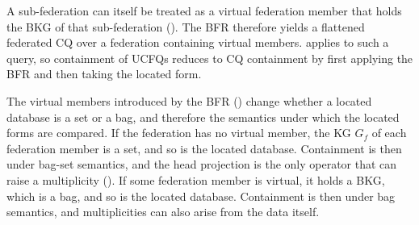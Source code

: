 \documentclass[../main]{subfiles}
\begin{document}
\begin{remark}\label{rem_ucfq_located}
  A sub-federation can itself be treated as a virtual federation member that holds the \ac{BKG} of that sub-federation ().
  The \ac{BFR} therefore yields a flattened federated \ac{CQ} over a federation containing virtual members.
   applies to such a query, so containment of \acp{UCFQ} reduces to \ac{CQ} containment by first applying the \ac{BFR} and then taking the located form.
\end{remark}

\begin{remark}\label{rem_located_db_bag}
  The virtual members introduced by the \ac{BFR} () change whether a located database is a set or a bag, and therefore the semantics under which the located forms are compared.
  If the federation has no virtual member, the \ac{KG} $G_f$ of each federation member is a set, and so is the located database.
  Containment is then under bag-set semantics, and the head projection is the only operator that can raise a multiplicity ().
  If some federation member is virtual, it holds a \ac{BKG}, which is a bag, and so is the located database.
  Containment is then under bag semantics, and multiplicities can also arise from the data itself.
\end{remark}
\end{document}
